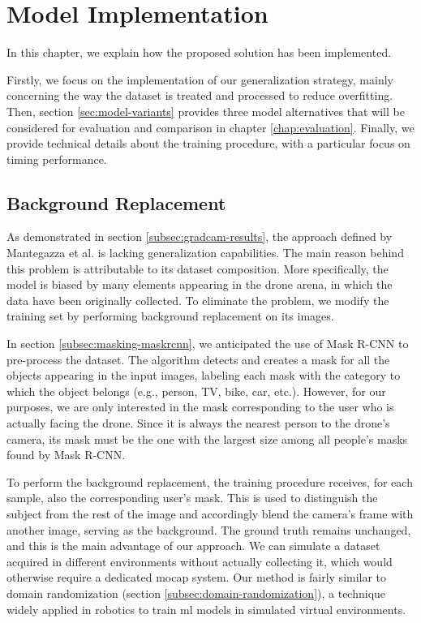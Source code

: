 \chapter{Model Implementation}
\label{chap:implementation}

In this chapter, we explain how the proposed solution has been implemented.

Firstly, we focus on the implementation of our generalization strategy, mainly concerning the way the dataset is treated and processed to reduce overfitting. Then, section \ref{sec:model-variants} provides three model alternatives that will be considered for evaluation and comparison in chapter \ref{chap:evaluation}. Finally, we provide technical details about the training procedure, with a particular focus on timing performance. 




\section{Background Replacement}
\label{sec:implementation-bgreplace}

As demonstrated in section \ref{subsec:gradcam-results}, the approach defined by Mantegazza et al. \cite{mantegazza2019visionbased} is lacking generalization capabilities. The main reason behind this problem is attributable to its dataset composition. More specifically, the model is biased by many elements appearing in the drone arena, in which the data have been originally collected. To eliminate the problem, we modify the training set by performing background replacement on its images.

In section \ref{subsec:masking-maskrcnn}, we anticipated the use of Mask R-CNN to pre-process the dataset. The algorithm detects and creates a mask for all the objects appearing in the input images, labeling each mask with the category to which the object belongs (e.g., person, TV, bike, car, etc.). However, for our purposes, we are only interested in the mask corresponding to the user who is actually facing the drone. Since it is always the nearest person to the drone's camera, its mask must be the one with the largest size among all people's masks found by Mask R-CNN.

To perform the background replacement, the training procedure receives, for each sample, also the corresponding user's mask. This is used to distinguish the subject from the rest of the image and accordingly blend the camera's frame with another image, serving as the background. The ground truth remains unchanged, and this is the main advantage of our approach. We can simulate a dataset acquired in different environments without actually collecting it, which would otherwise require a dedicated \gls{mocap} system. Our method is fairly similar to domain randomization (section \ref{subsec:domain-randomization}), a technique widely applied in robotics to train \gls{ml} models in simulated virtual environments.

